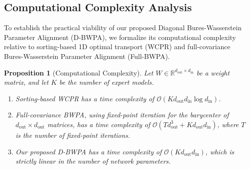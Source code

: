\documentclass{article}
\theoremstyle{plain}
\newtheorem{proposition}[theorem]{Proposition}
\theoremstyle{definition}
\theoremstyle{remark}
\begin{document}
\subsection{Computational Complexity Analysis}
To establish the practical viability of our proposed Diagonal Bures-Wasserstein Parameter Alignment (D-BWPA), we formalize its computational complexity relative to sorting-based 1D optimal transport (WCPR) and full-covariance Bures-Wasserstein Parameter Alignment (Full-BWPA).

\begin{proposition}[Computational Complexity]
Let $W \in \mathbb{R}^{d_{\text{out}} \times d_{\text{in}}}$ be a weight matrix, and let $K$ be the number of expert models. 
\begin{enumerate}
  \item Sorting-based WCPR has a time complexity of $\mathcal{O}(K d_{\text{out}} d_{\text{in}} \log d_{\text{in}})$.
  \item Full-covariance BWPA, using fixed-point iteration for the barycenter of $d_{\text{out}} \times d_{\text{out}}$ matrices, has a time complexity of $\mathcal{O}(T d_{\text{out}}^3 + K d_{\text{out}} d_{\text{in}})$, where $T$ is the number of fixed-point iterations.
  \item Our proposed D-BWPA has a time complexity of $\mathcal{O}(K d_{\text{out}} d_{\text{in}})$, which is strictly linear in the number of network parameters.
\end{enumerate}
\end{proposition}
\end{document}
